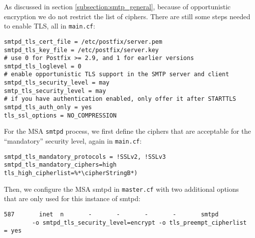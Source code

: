 


As discussed in section \ref{subsection:smtp_general}, because of opportunistic encryption we do not
restrict the list of ciphers. There are still some steps needed to
enable TLS, all in \verb|main.cf|:

\begin{lstlisting}
smtpd_tls_cert_file = /etc/postfix/server.pem
smtpd_tls_key_file = /etc/postfix/server.key
# use 0 for Postfix >= 2.9, and 1 for earlier versions
smtpd_tls_loglevel = 0
# enable opportunistic TLS support in the SMTP server and client
smtpd_tls_security_level = may
smtp_tls_security_level = may
# if you have authentication enabled, only offer it after STARTTLS
smtpd_tls_auth_only = yes
tls_ssl_options = NO_COMPRESSION
\end{lstlisting}

For the MSA \verb|smtpd| process, we first define the ciphers that are
acceptable for the ``mandatory'' security level, again in
\verb|main.cf|:

\begin{lstlisting}
smtpd_tls_mandatory_protocols = !SSLv2, !SSLv3
smtpd_tls_mandatory_ciphers=high
tls_high_cipherlist=%*\cipherStringB*)
\end{lstlisting}

Then, we configure the MSA smtpd in \verb|master.cf| with two
additional options that are only used for this instance of smtpd:

\begin{lstlisting}
587       inet  n       -       -       -       -       smtpd 
        -o smtpd_tls_security_level=encrypt -o tls_preempt_cipherlist = yes
\end{lstlisting}

